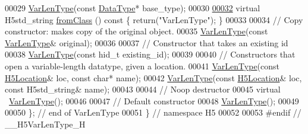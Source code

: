 \begin{DoxyCode}
00029         \hyperlink{class_h5_1_1_var_len_type}{VarLenType}(\textcolor{keyword}{const} \hyperlink{class_h5_1_1_data_type}{DataType}* base\_type);
00030 
\hyperlink{class_h5_1_1_var_len_type_a781d7c99f66c97e3b09039151ce9158c}{00032}         \textcolor{keyword}{virtual} H5std\_string \hyperlink{class_h5_1_1_var_len_type_a781d7c99f66c97e3b09039151ce9158c}{fromClass} ()\textcolor{keyword}{ const }\{ \textcolor{keywordflow}{return}(\textcolor{stringliteral}{"VarLenType"}); \}
00033 
00034         \textcolor{comment}{// Copy constructor: makes copy of the original object.}
00035         \hyperlink{class_h5_1_1_var_len_type}{VarLenType}(\textcolor{keyword}{const} \hyperlink{class_h5_1_1_var_len_type}{VarLenType}& original);
00036 
00037         \textcolor{comment}{// Constructor that takes an existing id}
00038         \hyperlink{class_h5_1_1_var_len_type}{VarLenType}(\textcolor{keyword}{const} hid\_t existing\_id);
00039 
00040         \textcolor{comment}{// Constructors that open a variable-length datatype, given a location.}
00041         \hyperlink{class_h5_1_1_var_len_type}{VarLenType}(\textcolor{keyword}{const} \hyperlink{class_h5_1_1_h5_location}{H5Location}& loc, \textcolor{keyword}{const} \textcolor{keywordtype}{char}* name);
00042         \hyperlink{class_h5_1_1_var_len_type}{VarLenType}(\textcolor{keyword}{const} \hyperlink{class_h5_1_1_h5_location}{H5Location}& loc, \textcolor{keyword}{const} H5std\_string& name);
00043 
00044         \textcolor{comment}{// Noop destructor}
00045         \textcolor{keyword}{virtual} ~\hyperlink{class_h5_1_1_var_len_type}{VarLenType}();
00046 
00047         \textcolor{comment}{// Default constructor}
00048         \hyperlink{class_h5_1_1_var_len_type}{VarLenType}();
00049 
00050 \}; \textcolor{comment}{// end of VarLenType}
00051 \} \textcolor{comment}{// namespace H5}
00052 
00053 \textcolor{preprocessor}{#endif // \_\_H5VarLenType\_H}
\end{DoxyCode}
